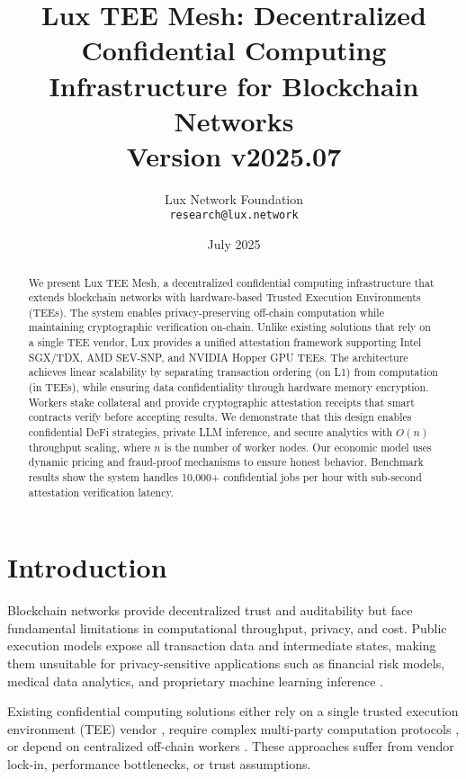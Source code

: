 \documentclass[11pt,letterpaper]{article}
\title{\textbf{Lux TEE Mesh: Decentralized Confidential Computing Infrastructure for Blockchain Networks}\\
\large Version v2025.07}
\author{
  Lux Network Foundation\\
  \texttt{research@lux.network}
}
\date{July 2025}
\begin{document}
\maketitle

\begin{abstract}
We present Lux TEE Mesh, a decentralized confidential computing infrastructure that extends blockchain networks with hardware-based Trusted Execution Environments (TEEs). The system enables privacy-preserving off-chain computation while maintaining cryptographic verification on-chain. Unlike existing solutions that rely on a single TEE vendor, Lux provides a unified attestation framework supporting Intel SGX/TDX, AMD SEV-SNP, and NVIDIA Hopper GPU TEEs. The architecture achieves linear scalability by separating transaction ordering (on L1) from computation (in TEEs), while ensuring data confidentiality through hardware memory encryption. Workers stake collateral and provide cryptographic attestation receipts that smart contracts verify before accepting results. We demonstrate that this design enables confidential DeFi strategies, private LLM inference, and secure analytics with $O(n)$ throughput scaling, where $n$ is the number of worker nodes. Our economic model uses dynamic pricing and fraud-proof mechanisms to ensure honest behavior. Benchmark results show the system handles 10,000+ confidential jobs per hour with sub-second attestation verification latency.
\end{abstract}

\section{Introduction}

Blockchain networks provide decentralized trust and auditability but face fundamental limitations in computational throughput, privacy, and cost. Public execution models expose all transaction data and intermediate states, making them unsuitable for privacy-sensitive applications such as financial risk models, medical data analytics, and proprietary machine learning inference \cite{ethereum-privacy,avalanche-subnets}.

Existing confidential computing solutions either rely on a single trusted execution environment (TEE) vendor \cite{secret-network,oasis-sapphire}, require complex multi-party computation protocols \cite{mpc-overview}, or depend on centralized off-chain workers \cite{iexec,truebit}. These approaches suffer from vendor lock-in, performance bottlenecks, or trust assumptions.
\end{document}
